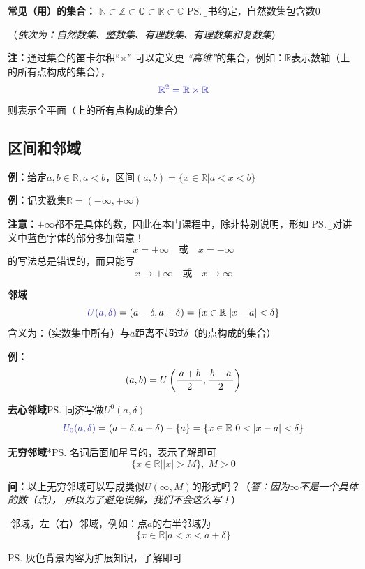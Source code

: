 {\bf 常见（用）的集合：}
$\mathbb{N}\subset\mathbb{Z}\subset\mathbb{Q}\subset\mathbb{R}\subset\mathbb{C}$
\ps{\b 本书约定，自然数集包含数$0$}
	
\quad （{\it 依次为：自然数集、整数集、有理数集、有理数集和复数集}）

{\bf 注：}通过集合的笛卡尔积“$\times$” 可以定义更{\it
“高维”}的集合，例如：$\mathbb{R}$表示数轴（上的所有点构成的集合），
$${\b \mathbb{R}^2=\mathbb{R}\times\mathbb{R}}$$
则表示全平面（上的所有点构成的集合）

\subsection{区间和邻域}

{\bf 例：}给定$a,b\in\mathbb{R},a<b$，区间$(a,b)=\{x\in\mathbb{R}|a<x<b\}$

{\bf 例：}记实数集$\mathbb{R}=(-\infty,+\infty)$

{\bf 注意：}{$\pm\infty$都不是具体的数，因此在本门课程中，除非特别说明，形如
\ps{\b 请对讲义中蓝色字体的部分多加留意！}
$$x=+\infty\quad\mbox{或}\quad x=-\infty$$
的写法总是错误的，而只能写
$$x\to+\infty\quad\mbox{或}\quad x\to\infty$$
}

{\bf 邻域}
$${\b U(a,\delta)}=(a-\delta,a+\delta)=\{x\in\mathbb{R}||x-a|<\delta\}$$
含义为：（实数集中所有）与$a$距离不超过$\delta$（的点构成的集合）

{\bf 例：}
$$(a,b)=U\left(\displaystyle\frac{\,{a+b}\,}{\,{2}\,},\displaystyle\frac{\,{b-a}\,}{\,{2}\,}\right)$$

{\bf 去心邻域}\ps{同济写做$U^0(a,\delta)$}
$${\b
U_0(a,\delta)}=(a-\delta,a+\delta)-\{a\}=\{x\in\mathbb{R}|0<|x-a|<\delta\}$$

{\bf 无穷邻域}*\ps{名词后面加星号的，表示了解即可}
$$\{x\in\mathbb{R}||x|>M\},\;M>0$$

{\bf 问：}以上无穷邻域可以写成类似$U(\infty,M)$的形式吗？（{\it 答：因为$\infty$不是一个具体的数（点），
所以为了避免误解，我们不会这么写！}）

{\b 半邻域，左（右）邻域}，例如：点$a$的右半邻域为
$$\{x\in\mathbb{R}|a<x<a+\delta\}$$

\ps{灰色背景内容为扩展知识，了解即可}

